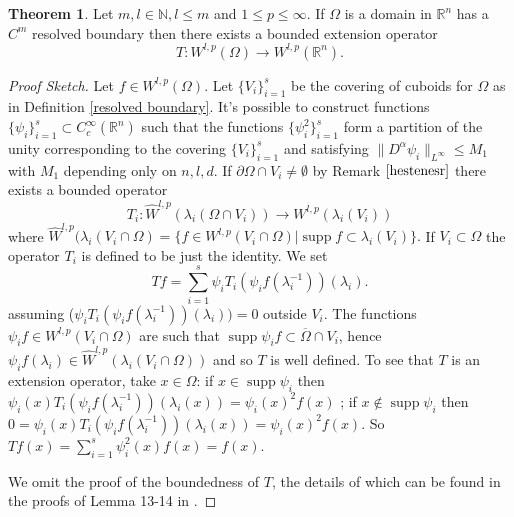 \documentclass[12pt]{article}
\theoremstyle{definition}
\newtheorem{theorem}{Theorem}
\DeclareMathOperator\supp{supp}
\begin{document}
\begin{theorem}\label{teorh}
Let $m,l \in \mathbb{N}, l\le m$ and $1\le p\le\infty$. If $\Omega$ is a domain in $\mathbb{R}^n$ has a $C^m$ resolved boundary then there exists a bounded extension operator
\[ T: W^{l,p}(\Omega) \rightarrow W^{l,p}(\mathbb{R}^n).\]
\end{theorem}
\begin{proof}[Proof Sketch]
Let $f \in W^{l,p}(\Omega)$. Let $\{V_i\}_{i=1}^s$ be the covering of cuboids for $\Omega$ as in Definition \ref{resolved boundary}. It's possible to construct functions $\{ \psi_i \}_{i=1}^s \subset C^\infty_c(\mathbb{R}^n)$ such that the functions $\{ \psi^2_i \}_{i=1}^s$ form a partition of the unity corresponding to the covering $\{V_i\}_{i=1}^s$ and satisfying $\|D^\alpha \psi_i \|_{L^\infty}\le M_1$ with $M_1$ depending only on $n,l,d$.  If $\partial \Omega \cap V_i \neq \emptyset$ by Remark $\ref{hestenesr}$ there exists a bounded operator
\[ T_i : \widehat W^{l,p}(\lambda_i(\Omega \cap V_i))\rightarrow W^{l,p}(\lambda_i(V_i))\]
where $\widehat W^{l,p}(\lambda_i(V_i\cap \Omega)=\{f \in W^{l,p}(V_i\cap \Omega) | \supp f \subset \lambda_i(V_i)  \}.$ If $V_i \subset \Omega$ the operator $T_i$ is defined to be just the identity. We set
\[ Tf = \sum_{i=1}^s \psi_iT_i(\psi_if(\lambda_i^{-1}))(\lambda_i).\]
assuming ($\psi_iT_i(\psi_if(\lambda_i^{-1}))(\lambda_i))=0$ outside $V_i$. The functions $\psi_if \in W^{l,p}(V_i\cap \Omega)$ are such that $\supp \psi_if \subset \overline \Omega \cap V_i$, hence $\psi_i f(\lambda_i) \in \widehat W^{l,p}(\lambda_i(V_i\cap \Omega))$ and so $T$ is well defined. To see that $T$ is an extension operator, take $x \in \Omega$: if $x \in \supp \psi_i$ then $\psi_i(x)T_i(\psi_if(\lambda_i^{-1}))(\lambda_i(x))=\psi_i(x)^2 f(x)$ ; if $x \notin \supp \psi_i$ then $0=\psi_i(x)T_i(\psi_if(\lambda_i^{-1}))(\lambda_i(x))=\psi_i(x)^2 f(x)$. So $Tf(x)=\sum\limits_{i=1}^s \psi_i^2(x) f(x)=f(x)$. 

We omit the proof of the boundedness of $T$, the details of which can be found in the proofs of Lemma 13-14 in \cite{burenkov}.
\end{proof}
\end{document}
